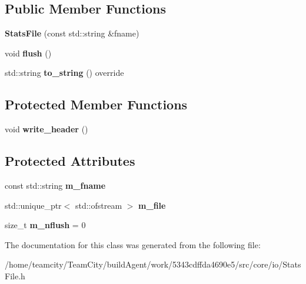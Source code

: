 \subsection*{Public Member Functions}
\begin{DoxyCompactItemize}
\item 
{\bfseries Stats\+File} (const std\+::string \&fname)\hypertarget{classStatsFile_aa62b000b927c9b48008459a9fed54653}{}\label{classStatsFile_aa62b000b927c9b48008459a9fed54653}

\item 
void {\bfseries flush} ()\hypertarget{classStatsFile_a9a96925c18c782acb1dab5a253f9f797}{}\label{classStatsFile_a9a96925c18c782acb1dab5a253f9f797}

\item 
std\+::string {\bfseries to\+\_\+string} () override\hypertarget{classStatsFile_a9021f3caf32ea41ded764595d66057c5}{}\label{classStatsFile_a9021f3caf32ea41ded764595d66057c5}

\end{DoxyCompactItemize}
\subsection*{Protected Member Functions}
\begin{DoxyCompactItemize}
\item 
void {\bfseries write\+\_\+header} ()\hypertarget{classStatsFile_a473d92c3e70b3d7d7bd469ed5eec42c7}{}\label{classStatsFile_a473d92c3e70b3d7d7bd469ed5eec42c7}

\end{DoxyCompactItemize}
\subsection*{Protected Attributes}
\begin{DoxyCompactItemize}
\item 
const std\+::string {\bfseries m\+\_\+fname}\hypertarget{classStatsFile_aa995dd14cb1160e8a866880ce1ce7e9b}{}\label{classStatsFile_aa995dd14cb1160e8a866880ce1ce7e9b}

\item 
std\+::unique\+\_\+ptr$<$ std\+::ofstream $>$ {\bfseries m\+\_\+file}\hypertarget{classStatsFile_abaa201792069bcaba74750e7a0ba8e5b}{}\label{classStatsFile_abaa201792069bcaba74750e7a0ba8e5b}

\item 
size\+\_\+t {\bfseries m\+\_\+nflush} = 0\hypertarget{classStatsFile_a054a146952fcf9a0b4f81b96fddbea9a}{}\label{classStatsFile_a054a146952fcf9a0b4f81b96fddbea9a}

\end{DoxyCompactItemize}


The documentation for this class was generated from the following file\+:\begin{DoxyCompactItemize}
\item 
/home/teamcity/\+Team\+City/build\+Agent/work/5343cdffda4690e5/src/core/io/Stats\+File.\+h\end{DoxyCompactItemize}
